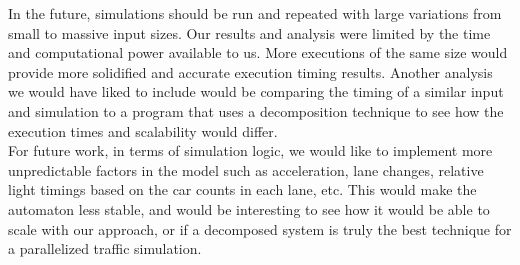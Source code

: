 \documentclass[conference]{IEEEtran}
\begin{document}
In the future, simulations should be run and repeated with large variations from small to massive input sizes. Our results and analysis were limited by the time and computational power available to us. More executions of the same size would provide more solidified and accurate execution timing results. Another analysis we would have liked to include would be comparing the timing of a similar input and simulation to a program that uses a decomposition technique to see how the execution times and scalability would differ.
 \\

For future work, in terms of simulation logic, we would like to implement more unpredictable factors in the model such as acceleration, lane changes, relative light timings based on the car counts in each lane, etc.  This would make the automaton less stable, and would be interesting to see how it would be able to scale with our approach, or if a decomposed system is truly the best technique for a parallelized traffic simulation.
\\




\end{document}
